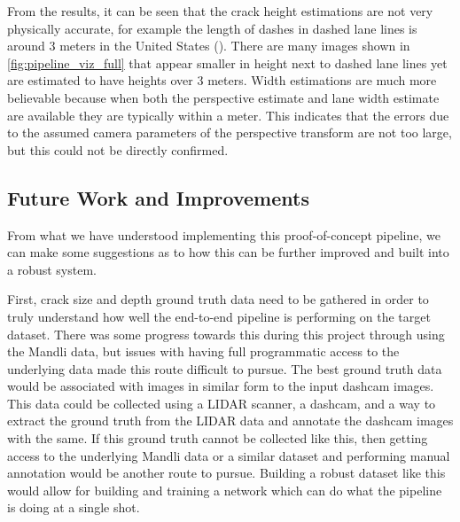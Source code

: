 \documentclass{article}
\begin{document}
From the results, it can be seen that the crack height estimations are not very physically accurate, for example the length of dashes in dashed lane lines is around 3 meters in the United States (\cite{us_lane_specs}).
There are many images shown in \ref{fig:pipeline_viz_full} that appear smaller in height next to dashed lane lines yet are estimated to have heights over 3 meters. 
Width estimations are much more believable because when both the perspective estimate and lane width estimate are available they are typically within a meter. 
This indicates that the errors due to the assumed camera parameters of the perspective transform are not too large, but this could not be directly confirmed.

\subsection{Future Work and Improvements}
From what we have understood implementing this proof-of-concept pipeline, we can make some suggestions as to how this can be further improved and built into a robust system.

First, crack size and depth ground truth data need to be gathered in order to truly understand how well the end-to-end pipeline is performing on the target dataset. 
There was some progress towards this during this project through using the Mandli data, but issues with having full programmatic access to the underlying data made this route difficult to pursue.
The best ground truth data would be associated with images in similar form to the input dashcam images.
This data could be collected using a LIDAR scanner, a dashcam, and a way to extract the ground truth from the LIDAR data and annotate the dashcam images with the same.
If this ground truth cannot be collected like this, then getting access to the underlying Mandli data or a similar dataset and performing manual annotation would be another route to pursue. 
Building a robust dataset like this would allow for building and training a network which can do what the pipeline is doing at a single shot.
\end{document}
